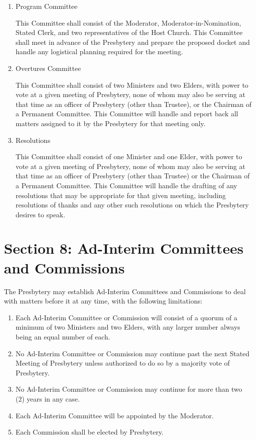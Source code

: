 \documentclass[
]{book}
\providecommand{\tightlist}{%
  \setlength{\itemsep}{0pt}\setlength{\parskip}{0pt}}
\begin{document}
\begin{enumerate}
\def\labelenumi{\Alph{enumi}.}
\item
  Program Committee

  This Committee shall consist of the Moderator, Moderator-in-Nomination, Stated Clerk, and two representatives of the Host Church. This Committee shall meet in advance of the Presbytery and prepare the proposed docket and handle any logistical planning required for the meeting.
\item
  Overtures Committee

  This Committee shall consist of two Ministers and two Elders, with power to vote at a given meeting of Presbytery, none of whom may also be serving at that time as an officer of Presbytery (other than Trustee), or the Chairman of a Permanent Committee. This Committee will handle and report back all matters assigned to it by the Presbytery for that meeting only.
\item
  Resolutions

  This Committee shall consist of one Minister and one Elder, with power to vote at a given meeting of Presbytery, none of whom may also be serving at that time as an officer of Presbytery (other than Trustee) or the Chairman of a Permanent Committee. This Committee will handle the drafting of any resolutions that may be appropriate for that given meeting, including resolutions of thanks and any other such resolutions on which the Presbytery desires to speak.
\end{enumerate}

\hypertarget{section-8-ad-interim-committees-and-commissions}{%
\section{Section 8: Ad-Interim Committees and Commissions}\label{section-8-ad-interim-committees-and-commissions}}

The Presbytery may establish Ad-Interim Committees and Commissions to deal with matters before it at any time, with the following limitations:

\begin{enumerate}
\def\labelenumi{\Alph{enumi}.}
\tightlist
\item
  Each Ad-Interim Committee or Commission will consist of a quorum of a minimum of two Ministers and two Elders, with any larger number always being an equal number of each.
\item
  No Ad-Interim Committee or Commission may continue past the next Stated Meeting of Presbytery unless authorized to do so by a majority vote of Presbytery.
\item
  No Ad-Interim Committee or Commission may continue for more than two (2) years in any case.
\item
  Each Ad-Interim Committee will be appointed by the Moderator.
\item
  Each Commission shall be elected by Presbytery.
\end{enumerate}
\end{document}
